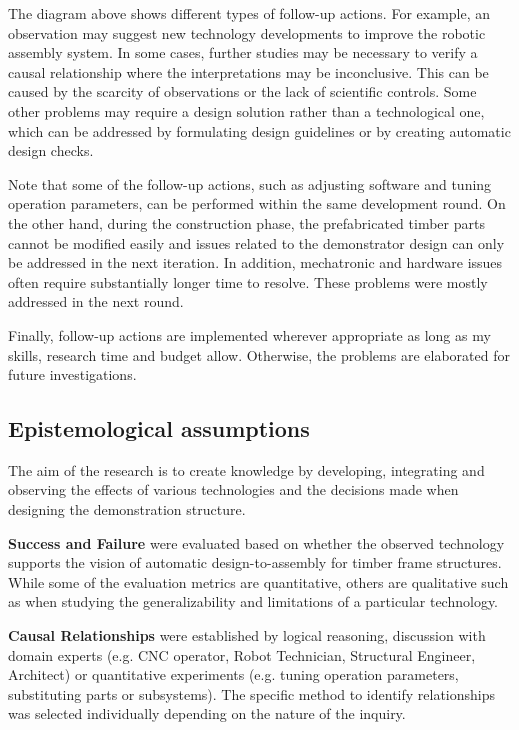 \documentclass[11pt]{book}
\begin{document}
The diagram above shows different types of follow-up actions. For example, an observation may suggest new technology developments to improve the robotic assembly system. In some cases, further studies may be necessary to verify a causal relationship where the interpretations may be inconclusive. This can be caused by the scarcity of observations or the lack of scientific controls. Some other problems may require a design solution rather than a technological one, which can be addressed by formulating design guidelines or by creating automatic design checks. 

Note that some of the follow-up actions, such as adjusting software and tuning operation parameters, can be performed within the same development round. On the other hand, during the construction phase, the prefabricated timber parts cannot be modified easily and issues related to the demonstrator design can only be addressed in the next iteration. In addition, mechatronic and hardware issues often require substantially longer time to resolve. These problems were mostly addressed in the next round. 

Finally, follow-up actions are implemented wherever appropriate as long as my skills, research time and budget allow. Otherwise, the problems are elaborated for future investigations. 

\subsection{Epistemological assumptions}

The aim of the research is to create knowledge by developing, integrating and observing the effects of various technologies and the decisions made when designing the demonstration structure.

\textbf{Success and Failure} were evaluated based on whether the observed technology supports the vision of automatic design-to-assembly for timber frame structures. While some of the evaluation metrics are quantitative, others are qualitative such as when studying the generalizability and limitations of a particular technology.

\textbf{Causal Relationships} were established by logical reasoning, discussion with domain experts (e.g. CNC operator, Robot Technician, Structural Engineer, Architect) or quantitative experiments (e.g. tuning operation parameters, substituting parts or subsystems). The specific method to identify relationships was selected individually depending on the nature of the inquiry.
\end{document}
